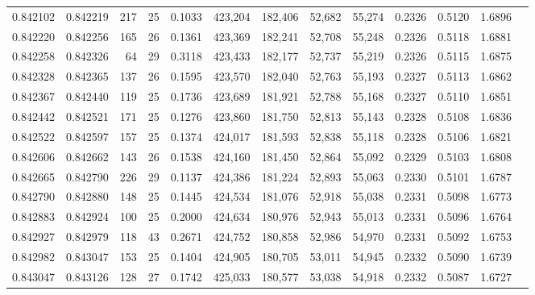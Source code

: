 \begin{tabular}{rrrrrrrrrrrrr}
0.842102 & 0.842219 &   217 &  25 &                                     0.1033 & 423,204 & 182,406 &  52,682 &  55,274 & 0.2326 & 0.5120 & 1.6896 \\
0.842220 & 0.842256 &   165 &  26 &                                     0.1361 & 423,369 & 182,241 &  52,708 &  55,248 & 0.2326 & 0.5118 & 1.6881 \\
0.842258 & 0.842326 &    64 &  29 &                                     0.3118 & 423,433 & 182,177 &  52,737 &  55,219 & 0.2326 & 0.5115 & 1.6875 \\
0.842328 & 0.842365 &   137 &  26 &                                     0.1595 & 423,570 & 182,040 &  52,763 &  55,193 & 0.2327 & 0.5113 & 1.6862 \\
0.842367 & 0.842440 &   119 &  25 &                                     0.1736 & 423,689 & 181,921 &  52,788 &  55,168 & 0.2327 & 0.5110 & 1.6851 \\
0.842442 & 0.842521 &   171 &  25 &                                     0.1276 & 423,860 & 181,750 &  52,813 &  55,143 & 0.2328 & 0.5108 & 1.6836 \\
0.842522 & 0.842597 &   157 &  25 &                                     0.1374 & 424,017 & 181,593 &  52,838 &  55,118 & 0.2328 & 0.5106 & 1.6821 \\
0.842606 & 0.842662 &   143 &  26 &                                     0.1538 & 424,160 & 181,450 &  52,864 &  55,092 & 0.2329 & 0.5103 & 1.6808 \\
0.842665 & 0.842790 &   226 &  29 &                                     0.1137 & 424,386 & 181,224 &  52,893 &  55,063 & 0.2330 & 0.5101 & 1.6787 \\
0.842790 & 0.842880 &   148 &  25 &                                     0.1445 & 424,534 & 181,076 &  52,918 &  55,038 & 0.2331 & 0.5098 & 1.6773 \\
0.842883 & 0.842924 &   100 &  25 &                                     0.2000 & 424,634 & 180,976 &  52,943 &  55,013 & 0.2331 & 0.5096 & 1.6764 \\
0.842927 & 0.842979 &   118 &  43 &                                     0.2671 & 424,752 & 180,858 &  52,986 &  54,970 & 0.2331 & 0.5092 & 1.6753 \\
0.842982 & 0.843047 &   153 &  25 &                                     0.1404 & 424,905 & 180,705 &  53,011 &  54,945 & 0.2332 & 0.5090 & 1.6739 \\
0.843047 & 0.843126 &   128 &  27 &                                     0.1742 & 425,033 & 180,577 &  53,038 &  54,918 & 0.2332 & 0.5087 & 1.6727 \\

\end{tabular}
